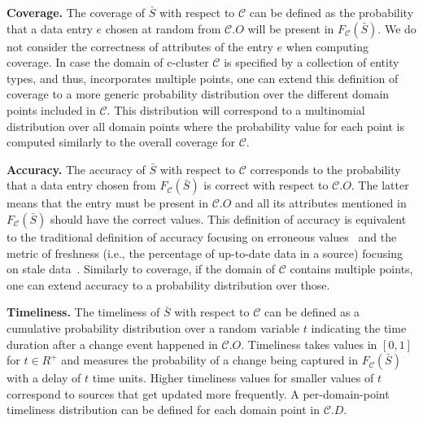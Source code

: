 \documentclass{sig-alternate}
\begin{document}
\vspace{3pt}\noindent\textbf{Coverage.} The coverage of $\bar{S}$ with respect to $\mathcal{C}$ can be defined as the probability that a data entry $e$ chosen at random from $\mathcal{C}.O$ will be present in $F_{\mathcal{C}}(\bar{S})$. We do not consider the correctness of attributes of the entry $e$ when computing coverage. In case the domain of c-cluster $\mathcal{C}$ is specified by a collection of entity types, and thus, incorporates multiple points, one can extend this definition of coverage to a more generic probability distribution over the different domain points included in $\mathcal{C}$. This distribution will correspond to a multinomial distribution over all domain points where the probability value for each point is computed similarly to the overall coverage for $\mathcal{C}$.

\vspace{3pt}\noindent\textbf{Accuracy.} The accuracy of $\bar{S}$ with respect to $\mathcal{C}$ corresponds to the probability that a data entry chosen from $F_{\mathcal{C}}(\bar{S})$ is correct with respect to $\mathcal{C}.O$. The latter means that the entry must be present in $\mathcal{C}.O$ and all its attributes mentioned in $F_{\mathcal{C}}(\bar{S})$ should have the correct values. This definition of accuracy is equivalent to the traditional definition of accuracy focusing on erroneous values~\cite{dong:vldb13} and the metric of freshness (i.e., the percentage of up-to-date data in a source) focusing on stale data~\cite{rekatsinas:2014}. Similarly to coverage, if the domain of $\mathcal{C}$ contains multiple points, one can extend accuracy to a probability distribution over those.

\vspace{3pt}\noindent\textbf{Timeliness.} The timeliness of $\bar{S}$ with respect to $\mathcal{C}$ can be defined as a cumulative probability distribution over a random variable $t$ indicating the time duration after a change event happened in $\mathcal{C}.O$. Timeliness takes values in $[0,1]$ for $t \in R^+$ and measures the probability of a change being captured in $F_{\mathcal{C}}(\bar{S})$ with a delay of $t$ time units. Higher timeliness values for smaller values of $t$ correspond to sources that get updated more frequently. A per-domain-point timeliness distribution can be defined for each domain point in $\mathcal{C}.D$.

\end{document}
